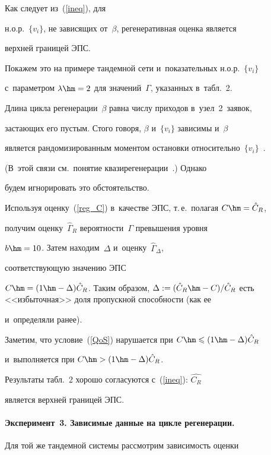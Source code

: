 Как следует из~(\ref{ineq}), для


н.о.р.~$\{v_i\}$, не зависящих от~$\beta$, регенеративная оценка  является 


верхней границей  ЭПС.


 Покажем это на примере тандемной сети и~показательных н.о.р.~$\{v_i\}$ 


 с~параметром $\lambda\hm=2$ для значений~$\Gamma$, указанных  в~табл.~2.


 Длина цикла регенерации~$\beta$  равна числу приходов в~узел~2~заявок, 


застающих его пустым. Стого  говоря,  $\beta$ и~$\{v_i\}$  зависимы и~$\beta$  


является рандомизированным моментом остановки относительно~$\{v_i\}$~\cite{Asmus}. 


(В~этой связи см.\ понятие квазирегенерации~\cite{Belyy}.)  Однако 


будем игнорировать это обстоятельство.


 Используя оценку~(\ref{reg_C}) в~качестве ЭПС, т.\,е.\ полагая $C\hm=\hat{C}_R$,  


получим  оценку~$\hat{\Gamma}_R$ вероятности~$\Gamma$ превышения   уровня 


$b\hm=10$. Затем  находим~$\Delta$ и~оценку~${\hat\Gamma}_{{\Delta}}$,  


соответствующую значению ЭПС


$C\hm= (1\hm-{\Delta})\hat{C}_R$. Таким образом, $\Delta := (\hat{C}_R \hm- 


C)/\hat{C}_R$ есть  <<избыточная>> доля пропускной способности (как ее 


и~определяли ранее).


Заметим, что условие~(\ref{QoS}) нарушается при $C \hm\leqslant (1\hm- {\Delta})\hat{C}_R$  


и~выполняется  при $C\hm>(1\hm-{\Delta})\hat{C}_R$.


Результаты  табл.~2  хорошо  согласуются с~(\ref{ineq}):    $\hat{C_R}$  


является  верхней границей ЭПС.


    





\paragraph*{Эксперимент~3. Зависимые данные на  цикле регенерации.}


Для той  же тандемной системы рассмотрим  зависимость  оценки 


